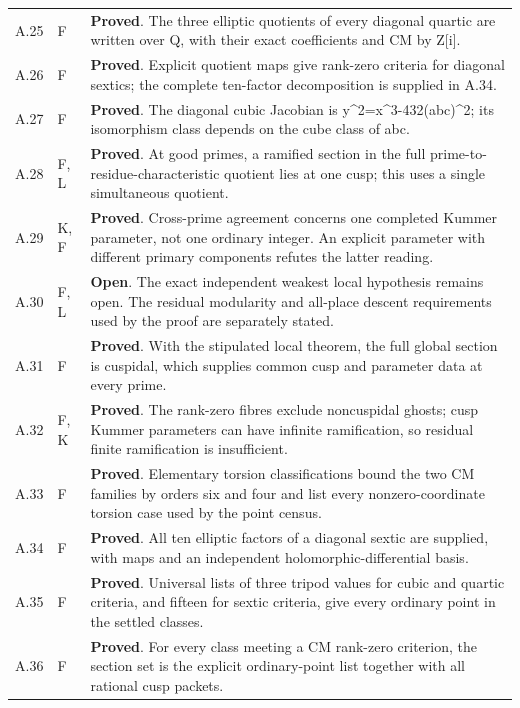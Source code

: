 \begin{longtable}{@{}p{}p{}p{}@{}}
A.25 & F & \textbf{Proved}. The three elliptic quotients of every diagonal quartic are written over Q, with their exact coefficients and CM by Z[i]. \\
A.26 & F & \textbf{Proved}. Explicit quotient maps give rank-zero criteria for diagonal sextics; the complete ten-factor decomposition is supplied in A.34. \\
A.27 & F & \textbf{Proved}. The diagonal cubic Jacobian is y\textasciicircum{}2=x\textasciicircum{}3-432(abc)\textasciicircum{}2; its isomorphism class depends on the cube class of abc. \\
A.28 & F, L & \textbf{Proved}. At good primes, a ramified section in the full prime-to-residue-characteristic quotient lies at one cusp; this uses a single simultaneous quotient. \\
A.29 & K, F & \textbf{Proved}. Cross-prime agreement concerns one completed Kummer parameter, not one ordinary integer. An explicit parameter with different primary components refutes the latter reading. \\
A.30 & F, L & \textbf{Open}. The exact independent weakest local hypothesis remains open. The residual modularity and all-place descent requirements used by the proof are separately stated. \\
A.31 & F & \textbf{Proved}. With the stipulated local theorem, the full global section is cuspidal, which supplies common cusp and parameter data at every prime. \\
A.32 & F, K & \textbf{Proved}. The rank-zero fibres exclude noncuspidal ghosts; cusp Kummer parameters can have infinite ramification, so residual finite ramification is insufficient. \\
A.33 & F & \textbf{Proved}. Elementary torsion classifications bound the two CM families by orders six and four and list every nonzero-coordinate torsion case used by the point census. \\
A.34 & F & \textbf{Proved}. All ten elliptic factors of a diagonal sextic are supplied, with maps and an independent holomorphic-differential basis. \\
A.35 & F & \textbf{Proved}. Universal lists of three tripod values for cubic and quartic criteria, and fifteen for sextic criteria, give every ordinary point in the settled classes. \\
A.36 & F & \textbf{Proved}. For every class meeting a CM rank-zero criterion, the section set is the explicit ordinary-point list together with all rational cusp packets. \\

\end{longtable}
